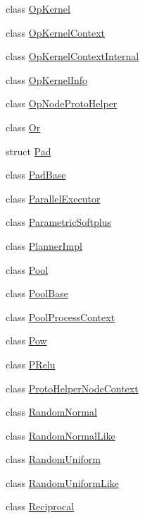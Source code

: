\begin{DoxyCompactItemize}
class \mbox{\hyperlink{classonnxruntime_1_1OpKernel}{Op\+Kernel}}
\item 
class \mbox{\hyperlink{classonnxruntime_1_1OpKernelContext}{Op\+Kernel\+Context}}
\item 
class \mbox{\hyperlink{classonnxruntime_1_1OpKernelContextInternal}{Op\+Kernel\+Context\+Internal}}
\item 
class \mbox{\hyperlink{classonnxruntime_1_1OpKernelInfo}{Op\+Kernel\+Info}}
\item 
class \mbox{\hyperlink{classonnxruntime_1_1OpNodeProtoHelper}{Op\+Node\+Proto\+Helper}}
\item 
class \mbox{\hyperlink{classonnxruntime_1_1Or}{Or}}
\item 
struct \mbox{\hyperlink{structonnxruntime_1_1Pad}{Pad}}
\item 
class \mbox{\hyperlink{classonnxruntime_1_1PadBase}{Pad\+Base}}
\item 
class \mbox{\hyperlink{classonnxruntime_1_1ParallelExecutor}{Parallel\+Executor}}
\item 
class \mbox{\hyperlink{classonnxruntime_1_1ParametricSoftplus}{Parametric\+Softplus}}
\item 
class \mbox{\hyperlink{classonnxruntime_1_1PlannerImpl}{Planner\+Impl}}
\item 
class \mbox{\hyperlink{classonnxruntime_1_1Pool}{Pool}}
\item 
class \mbox{\hyperlink{classonnxruntime_1_1PoolBase}{Pool\+Base}}
\item 
class \mbox{\hyperlink{classonnxruntime_1_1PoolProcessContext}{Pool\+Process\+Context}}
\item 
class \mbox{\hyperlink{classonnxruntime_1_1Pow}{Pow}}
\item 
class \mbox{\hyperlink{classonnxruntime_1_1PRelu}{P\+Relu}}
\item 
class \mbox{\hyperlink{classonnxruntime_1_1ProtoHelperNodeContext}{Proto\+Helper\+Node\+Context}}
\item 
class \mbox{\hyperlink{classonnxruntime_1_1RandomNormal}{Random\+Normal}}
\item 
class \mbox{\hyperlink{classonnxruntime_1_1RandomNormalLike}{Random\+Normal\+Like}}
\item 
class \mbox{\hyperlink{classonnxruntime_1_1RandomUniform}{Random\+Uniform}}
\item 
class \mbox{\hyperlink{classonnxruntime_1_1RandomUniformLike}{Random\+Uniform\+Like}}
\item 
class \mbox{\hyperlink{classonnxruntime_1_1Reciprocal}{Reciprocal}}

\end{DoxyCompactItemize}
